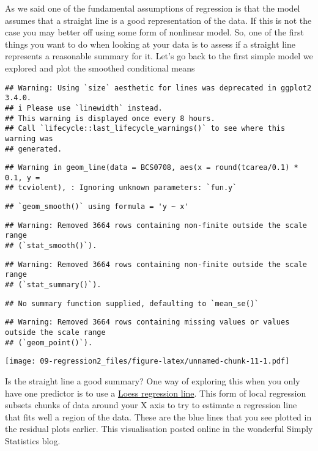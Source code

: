 \documentclass[
]{book}
\begin{document}
As we said one of the fundamental assumptions of regression is that the model assumes that a straight line is a good representation of the data. If this is not the case you may better off using some form of nonlinear model. So, one of the first things you want to do when looking at your data is to assess if a straight line represents a reasonable summary for it. Let's go back to the first simple model we explored and plot the smoothed conditional means

\begin{verbatim}
## Warning: Using `size` aesthetic for lines was deprecated in ggplot2 3.4.0.
## i Please use `linewidth` instead.
## This warning is displayed once every 8 hours.
## Call `lifecycle::last_lifecycle_warnings()` to see where this warning was
## generated.
\end{verbatim}

\begin{verbatim}
## Warning in geom_line(data = BCS0708, aes(x = round(tcarea/0.1) * 0.1, y =
## tcviolent), : Ignoring unknown parameters: `fun.y`
\end{verbatim}

\begin{verbatim}
## `geom_smooth()` using formula = 'y ~ x'
\end{verbatim}

\begin{verbatim}
## Warning: Removed 3664 rows containing non-finite outside the scale range
## (`stat_smooth()`).
\end{verbatim}

\begin{verbatim}
## Warning: Removed 3664 rows containing non-finite outside the scale range
## (`stat_summary()`).
\end{verbatim}

\begin{verbatim}
## No summary function supplied, defaulting to `mean_se()`
\end{verbatim}

\begin{verbatim}
## Warning: Removed 3664 rows containing missing values or values outside the scale range
## (`geom_point()`).
\end{verbatim}

\texttt{[image: 09-regression2\_files/figure-latex/unnamed-chunk-11-1.pdf]}

Is the straight line a good summary? One way of exploring this when you only have one predictor is to use a \href{http://en.wikipedia.org/wiki/Local_regression}{Loess regression line}. This form of local regression subsets chunks of data around your X axis to try to estimate a regression line that fits well a region of the data. These are the blue lines that you see plotted in the residual plots earlier. This visualisation posted online in the wonderful Simply Statistics blog.
\end{document}
